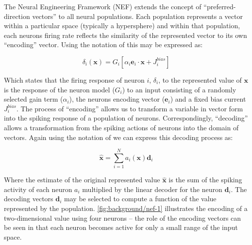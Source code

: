 \documentclass[conference]{IEEEtran}
\renewcommand{\vec}{\mathbf}  %
\begin{document}
The Neural Engineering Framework (NEF) extends the concept of ``preferred-direction vectors'' \parencite{} to all neural populations. Each population represents a vector within a particular space (typically a hypersphere) and within that population, each neurons firing rate reflects the similarity of the represented vector to its own ``encoding'' vector. Using the notation of \textcite{Stewart2014} this may be expressed as:

\begin{equation}
  \delta_{i}\left(\vec{x}\right) = G_{i}\left[ \alpha_i \vec{e}_i \cdot \vec{x} + J^{bias}_i \right]
  \label{eq:encoding}
\end{equation}

Which states that the firing response of neuron $i$, $\delta_i$, to the represented value of $\vec{x}$ is the response of the neuron model ($G_{i}$) to an input consisting of a randomly selected gain term ($\alpha_i$), the neurons encoding vector ($\vec{e}_i$) and a fixed bias current $J^{bias}_i$. The process of ``encoding'' allows us to transform a variable in vector form into the spiking response of a population of neurons. Correspondingly, ``decoding'' allows a transformation from the spiking actions of neurons into the domain of vectors. Again using the notation of \textcite{Stewart2014} we can express this decoding process as:

\begin{equation}
  \vec{\hat{x}} = \sum\limits_{i=1}^{N} a_i(\vec{x})\vec{d}_i  \label{eq:decoding}
\end{equation}

Where the estimate of the original represented value $\vec{\hat{x}}$ is the sum of the spiking activity of each neuron $a_i$ multiplied by the linear decoder for the neuron $\vec{d}_i$. The decoding vectors $\vec{d}_i$ may be selected to compute a function of the value represented by the population. \figurename \ref{fig:background/nef-1} illustrates the encoding of a two-dimensional value using four neurons -- the role of the encoding vectors can be seen in that each neuron becomes active for only a small range of the input space.
\end{document}
